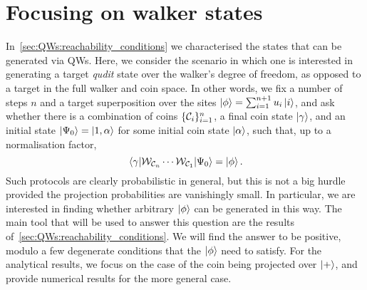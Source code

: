 

\section{Focusing on walker states}
\label{sec:QWs:focusing_walker_states}

In~\cref{sec:QWs:reachability_conditions} we characterised the states that can be generated via \acp{QW}.
Here, we consider the scenario in which one is interested in generating a target \emph{qudit} state over the walker's degree of freedom, as opposed to a target in the full walker and coin space.
In other words, we fix a number of steps $n$ and a target superposition over the sites $\ket\phi=\sum_{i=1}^{n+1} u_i\ket i$, and ask whether there is a combination of coins $\{{\mathcal{C}}_i\}_{i=1}^{n}$, a final coin state $\ket\gamma$, and an initial state $\ket{\Psi_0}=\ket{1, \alpha}$ for some initial coin state $\ket\alpha$, such that, up to a normalisation factor,
\begin{equation}
    \mel{\gamma}{{\mathcal{W}}_{{\mathcal{C}}_{n}} \cdots{\mathcal{W}}_{{\mathcal{C}}_{1}}}{\Psi_0} = \ket\phi.
\end{equation}
Such protocols are clearly probabilistic in general, but this is not a big hurdle provided the projection probabilities are vanishingly small.
In particular, we are interested in finding whether arbitrary $\ket\phi$ can be generated in this way.
The main tool that will be used to answer this question are the results of~\cref{sec:QWs:reachability_conditions}.
We will find the answer to be positive, modulo a few degenerate conditions that the $\ket\phi$ need to satisfy.
For the analytical results, we focus on the case of the coin being projected over $\ket+$,
and provide numerical results for the more general case.

